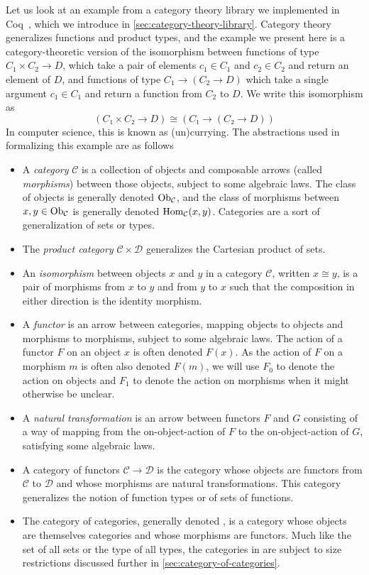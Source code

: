 Let us look at an example from a category theory library we implemented in Coq~\cite{category-coq-experience}, which we introduce in \autoref{sec:category-theory-library}.
Category theory generalizes functions and product types, and the example we present here is a category-theoretic version of the isomorphism between functions of type $C_1 \times C_2 \to D$, which take a pair of elements $c_1 \in C_1$ and $c_2 \in C_2$ and return an element of $D$, and functions of type $C_1 \to (C_2 \to D)$ which take a single argument $c_1 \in C_1$ and return a function from $C_2$ to $D$.
We write this isomorphism as
\[
(C₁ × C₂ → D) ≅ (C₁ → (C₂ → D))
\]
In computer science, this is known as (un)currying.
The abstractions used in formalizing this example are as follows
\begin{itemize}
\item
  A \emph{category} $\mathcal C$ is a collection of objects and composable arrows (called \emph{morphisms}) between those objects, subject to some algebraic laws.
  The class of objects is generally denoted $\Ob[\mathcal C]$, and the class of morphisms between $x, y\in \Ob[\mathcal C]$ is generally denoted $\Hom[\mathcal C](x, y)$.
  Categories are a sort of generalization of sets or types.
\item
  The \emph{product category} $\mathcal C \times \mathcal D$ generalizes the Cartesian product of sets.
\item
  An \emph{isomorphism} between objects $x$ and $y$ in a category $\mathcal C$, written $x \cong y$, is a pair of morphisms from $x$ to $y$ and from $y$ to $x$ such that the composition in either direction is the identity morphism.
\item
  A \emph{functor} is an arrow between categories, mapping objects to objects and morphisms to morphisms, subject to some algebraic laws.
  The action of a functor $F$ on an object $x$ is often denoted $F(x)$.
  As the action of $F$ on a morphism $m$ is often also denoted $F(m)$, we will use $F_0$ to denote the action on objects and $F_1$ to denote the action on morphisms when it might otherwise be unclear.
\item
  A \emph{natural transformation} is an arrow between functors $F$ and $G$ consisting of a way of mapping from the on-object-action of $F$ to the on-object-action of $G$, satisfying some algebraic laws.
\item
  A category of functors $\mathcal C \to \mathcal D$ is the category whose objects are functors from $\mathcal C$ to $\mathcal D$ and whose morphisms are natural transformations.
  This category generalizes the notion of function types or of sets of functions.
\item
  The category of categories, generally denoted \Cat, is a category whose objects are themselves categories and whose morphisms are functors.
  Much like the set of all sets or the type of all types, the categories in \Cat\space are subject to size restrictions discussed further in \autoref{sec:category-of-categories}.
\end{itemize}
